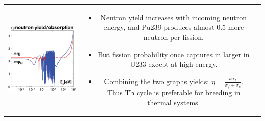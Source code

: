 \documentclass{school-22.211-notes}
\begin{document}
\begin{enumerate}
\begin{tabular}{ccc}
\begin{minipage}[b]{0.3\linewidth}
      \includegraphics[width=\textwidth]{images/dfs/U-vs-Th-2.png}
    \end{minipage}
    &
    \begin{minipage}[b]{0.38\linewidth}
      \begin{itemize}
      \item Neutron yield increases with incoming neutron energy, and
        Pu239 produces almost 0.5 more neutron per fission.
      \item But fission probability once captures in larger in U233
        except at high energy.
      \item Combining the two graphs yields: $\eta = \frac{\nu
        \sigma_f}{\sigma_f + \sigma_c}$. Thus Th cycle is preferable
        for breeding in thermal systems.
      \end{itemize}
    \end{minipage}
  \end{tabular}
      

\end{enumerate}
\end{document}
